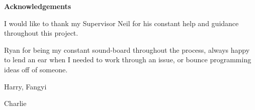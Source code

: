 
\thispagestyle{empty}

\begin{center}
    {\LARGE\bf Acknowledgements}
\end{center}

I would like to thank my Supervisor Neil for his constant help and guidance throughout this project.

Ryan for being my constant sound-board throughout the process, always happy to lend an ear when I needed to work through an issue, or bounce programming ideas off of someone.

Harry, Fangyi

Charlie
